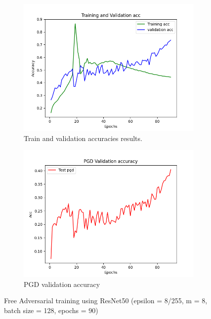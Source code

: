 \documentclass{article}
\begin{document}
\begin{figure}[hbt!]
  \centering
  \begin{subfigure}[b]{0.4\linewidth}
    \includegraphics[width=\linewidth]{images/FreeResnet/Figure_2.png}
    \caption{ Train and validation accuracies results.}
  \end{subfigure}
  \begin{subfigure}[b]{0.4\linewidth}
    \includegraphics[width=\linewidth]{images/FreeResnet/Figure_5.png}
    \caption{PGD validation accuracy}
  \end{subfigure}
  \caption{Free Adversarial training using ResNet50 (epsilon = 8/255, m = 8, batch size = 128,  epochs = 90)}
  \label{fig:coffee}
\end{figure}
\end{document}
